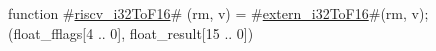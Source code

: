 function #\hyperref[sailRISCVzriscvzyi32ToF16]{riscv\_i32ToF16}# (rm, v) = {
  #\hyperref[sailRISCVzexternzyi32ToF16]{extern\_i32ToF16}#(rm, v);
  (float_fflags[4 .. 0], float_result[15 .. 0])
}
